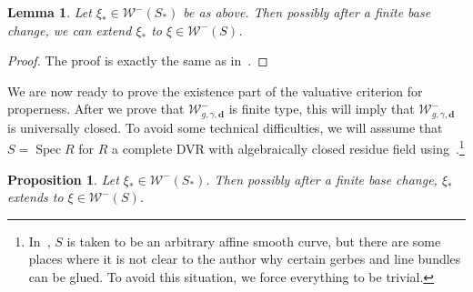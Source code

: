 \documentclass{amsart}
\newtheorem{prop}[thm]{Proposition}
\newtheorem{lem}[thm]{Lemma}
\theoremstyle{definition}
\theoremstyle{remark}
\theoremstyle{plain}
\theoremstyle{definition}
\theoremstyle{remark}
\newcommand{\mc}[1]{\mathcal{#1}}
\newcommand{\mbf}[1]{\mathbf{#1}}
\newcommand{\1}{\mathbf{1}}
\newcommand{\2}{\mathbf{2}}
\newcommand{\3}{\mathbf{3}}
\DeclareMathOperator{\Spec}{Spec}
\begin{document}
\begin{lem}\label{lem:extsmoothsource}
    Let $\xi_* \in \mc{W}^-(S_*)$ be as above. Then possibly after a finite base change, we can extend $\xi_*$ to $\xi \in \mc{W}^-(S)$.
\end{lem}

    


\begin{proof}
    The proof is exactly the same as in~\cite[\S 3.2]{nmsp}.
\end{proof}

We are now ready to prove the existence part of the valuative criterion for properness. After we prove that $\mc{W}^-_{g,\gamma,\mbf{d}}$ is finite type, this will imply that $\mc{W}^-_{g,\gamma,\mbf{d}}$ is universally closed. To avoid some technical difficulties, we will asssume that $S = \Spec R$ for $R$ a complete DVR with algebraically closed residue field using~\cite[Theorem 7.10]{champs}.\footnote{In~\cite{mspfermat}, $S$ is taken to be an arbitrary affine smooth curve, but there are some places where it is not clear to the author why certain gerbes and line bundles can be glued. To avoid this situation, we force everything to be trivial.}

\begin{prop}\label{prop:existence}
    Let $\xi_* \in \mc{W}^-(S_*)$. Then possibly after a finite base change, $\xi_*$ extends to $\xi \in \mc{W}^-(S)$. 
\end{prop}
\end{document}
